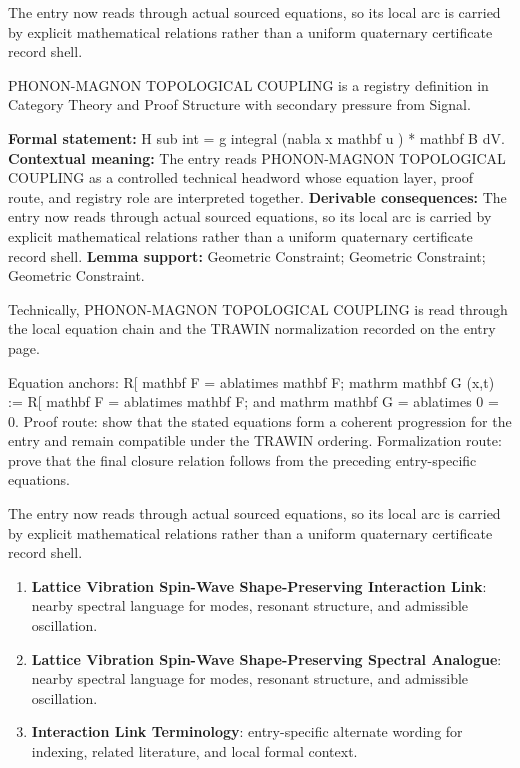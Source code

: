 The entry now reads through actual sourced equations, so its local arc is carried by explicit mathematical relations rather than a uniform quaternary certificate record shell.
\clearpage


\begingroup\small
{}
PHONON-MAGNON TOPOLOGICAL COUPLING is a registry definition in Category Theory and Proof Structure with secondary pressure from Signal.

\begingroup\footnotesize\setlength{\emergencystretch}{3em}\sloppy
\textbf{Formal statement:} H sub int = g integral (nabla x mathbf u ) * mathbf B dV. \textbf{Contextual meaning:} The entry reads PHONON-MAGNON TOPOLOGICAL COUPLING as a controlled technical headword whose equation layer, proof route, and registry role are interpreted together. \textbf{Derivable consequences:} The entry now reads through actual sourced equations, so its local arc is carried by explicit mathematical relations rather than a uniform quaternary certificate record shell. \textbf{Lemma support:} Geometric Constraint; Geometric Constraint; Geometric Constraint.\par
\endgroup

Technically, PHONON-MAGNON TOPOLOGICAL COUPLING is read through the local equation chain and the TRAWIN normalization recorded on the entry page.

Equation anchors: R[ mathbf F = ablatimes mathbf F; mathrm mathbf G (x,t) := R[ mathbf F = ablatimes mathbf F; and mathrm mathbf G = ablatimes 0 = 0. Proof route: show that the stated equations form a coherent progression for the entry and remain compatible under the TRAWIN ordering. Formalization route: prove that the final closure relation follows from the preceding entry-specific equations.

The entry now reads through actual sourced equations, so its local arc is carried by explicit mathematical relations rather than a uniform quaternary certificate record shell.
\endgroup

\begin{enumerate}[leftmargin=1.6em,itemsep=6pt,topsep=4pt]
\item \textbf{Lattice Vibration Spin-Wave Shape-Preserving Interaction Link}: nearby spectral language for modes, resonant structure, and admissible oscillation.
\item \textbf{Lattice Vibration Spin-Wave Shape-Preserving Spectral Analogue}: nearby spectral language for modes, resonant structure, and admissible oscillation.
\item \textbf{Interaction Link Terminology}: entry-specific alternate wording for indexing, related literature, and local formal context.
\end{enumerate}

